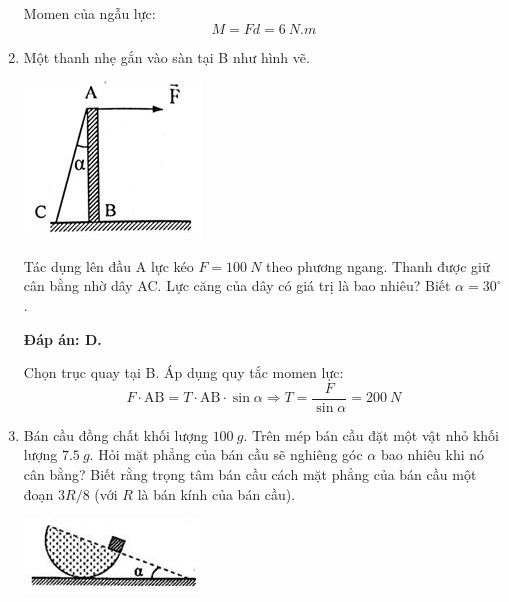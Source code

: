 \begin{enumerate}[label=\bfseries Câu \arabic*:]
{		Momen của ngẫu lực:
		$$M=Fd = \SI{6}{N.m}$$
	}

	\item {}
	
	
	{Một thanh nhẹ gắn vào sàn tại B như hình vẽ.
		\begin{center}
			\includegraphics[scale=1]{../figs/VN10-2021-PH-TP021-6.png}
		\end{center}
		Tác dụng lên đầu A lực kéo $F=\SI{100}{N}$ theo phương ngang. Thanh được giữ cân bằng nhờ dây AC. Lực căng của dây có giá trị là bao nhiêu? Biết $\alpha = 30^\circ$.
	}
	
	\hideall
	{	\textbf{Đáp án: D.}	
		
		Chọn trục quay tại B. Áp dụng quy tắc momen lực:
		$$F \cdot \text{AB} = T \cdot \text{AB} \cdot \sin \alpha \Rightarrow T = \dfrac{F}{\sin \alpha} = \SI{200}{N}$$
	}
	
	
	
	\item {}
	
	
	{Bán cầu đồng chất khối lượng $\SI{100}{g}$. Trên mép bán cầu đặt một vật nhỏ khối lượng $\SI{7.5}{g}$. Hỏi mặt phẳng của bán cầu sẽ nghiêng góc $\alpha$ bao nhiêu khi nó cân bằng? Biết rằng trọng tâm bán cầu cách mặt phẳng của bán cầu một đoạn $3R/8$ (với $R$ là bán kính của bán cầu).
		\begin{center}
			\includegraphics[scale=1]{../figs/VN10-2021-PH-TP021-7.png}
		\end{center}
	}
	

\end{enumerate}
